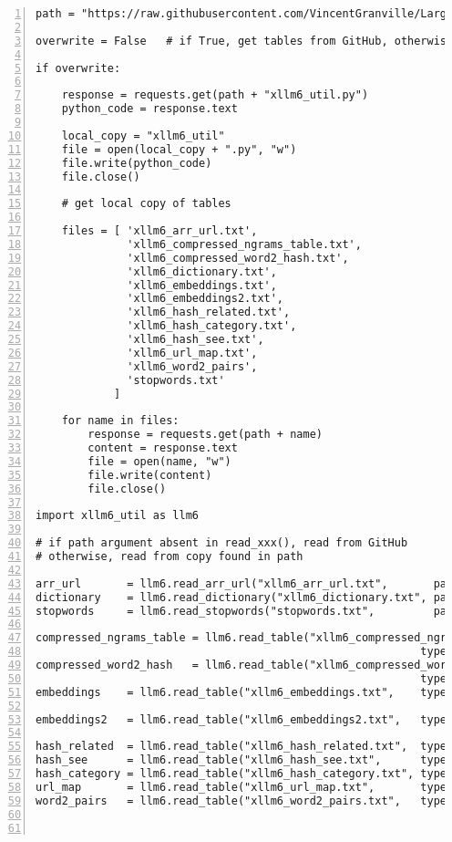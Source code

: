 \documentclass[oneside,10pt]{book}
\begin{document}
\begin{lstlisting}[numbers=left]
path = "https://raw.githubusercontent.com/VincentGranville/Large-Language-Models/main/xllm6/"

overwrite = False   # if True, get tables from GitHub, otherwise use local copy

if overwrite:

    response = requests.get(path + "xllm6_util.py")
    python_code = response.text

    local_copy = "xllm6_util"
    file = open(local_copy + ".py", "w")
    file.write(python_code)
    file.close()

    # get local copy of tables

    files = [ 'xllm6_arr_url.txt', 
              'xllm6_compressed_ngrams_table.txt',
              'xllm6_compressed_word2_hash.txt',
              'xllm6_dictionary.txt',
              'xllm6_embeddings.txt',
              'xllm6_embeddings2.txt',
              'xllm6_hash_related.txt',
              'xllm6_hash_category.txt',
              'xllm6_hash_see.txt',
              'xllm6_url_map.txt',
              'xllm6_word2_pairs',
              'stopwords.txt'
            ]

    for name in files:
        response = requests.get(path + name)
        content = response.text
        file = open(name, "w")
        file.write(content)
        file.close()  

import xllm6_util as llm6

# if path argument absent in read_xxx(), read from GitHub
# otherwise, read from copy found in path

arr_url       = llm6.read_arr_url("xllm6_arr_url.txt",       path="")
dictionary    = llm6.read_dictionary("xllm6_dictionary.txt", path="")
stopwords     = llm6.read_stopwords("stopwords.txt",         path="")

compressed_ngrams_table = llm6.read_table("xllm6_compressed_ngrams_table.txt", 
                                                           type="list", path="")
compressed_word2_hash   = llm6.read_table("xllm6_compressed_word2_hash.txt", 
                                                           type="hash", path="")
embeddings    = llm6.read_table("xllm6_embeddings.txt",    type="hash", path="", 
                                                                 format="float") 
embeddings2   = llm6.read_table("xllm6_embeddings2.txt",   type="hash", path="", 
                                                                 format="float") 
hash_related  = llm6.read_table("xllm6_hash_related.txt",  type="hash", path="")
hash_see      = llm6.read_table("xllm6_hash_see.txt",      type="hash", path="")
hash_category = llm6.read_table("xllm6_hash_category.txt", type="hash", path="")
url_map       = llm6.read_table("xllm6_url_map.txt",       type="hash", path="")
word2_pairs   = llm6.read_table("xllm6_word2_pairs.txt",   type="list", path="")



\end{lstlisting}
\end{document}
